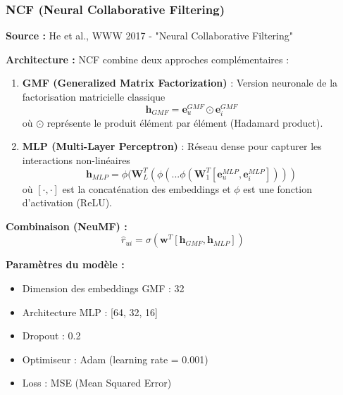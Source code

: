 \documentclass[12pt,a4paper]{article}
\begin{document}
\subsubsection{NCF (Neural Collaborative Filtering)}

\textbf{Source :} He et al., WWW 2017 - "Neural Collaborative Filtering"

\textbf{Architecture :} NCF combine deux approches complémentaires :

\begin{enumerate}
    \item \textbf{GMF (Generalized Matrix Factorization)} : Version neuronale de la factorisation matricielle classique
    \begin{equation}
        \mathbf{h}_{GMF} = \mathbf{e}_u^{GMF} \odot \mathbf{e}_i^{GMF}
    \end{equation}
    où $\odot$ représente le produit élément par élément (Hadamard product).
    
    \item \textbf{MLP (Multi-Layer Perceptron)} : Réseau dense pour capturer les interactions non-linéaires
    \begin{equation}
        \mathbf{h}_{MLP} = \phi(\mathbf{W}_L^T(\phi(...\phi(\mathbf{W}_1^T[\mathbf{e}_u^{MLP}, \mathbf{e}_i^{MLP}])))
    \end{equation}
    où $[\cdot, \cdot]$ est la concaténation des embeddings et $\phi$ est une fonction d'activation (ReLU).
\end{enumerate}

\textbf{Combinaison (NeuMF) :}
\begin{equation}
    \hat{r}_{ui} = \sigma(\mathbf{w}^T [\mathbf{h}_{GMF}, \mathbf{h}_{MLP}])
\end{equation}

\textbf{Paramètres du modèle :}
\begin{itemize}
    \item Dimension des embeddings GMF : 32
    \item Architecture MLP : [64, 32, 16]
    \item Dropout : 0.2
    \item Optimiseur : Adam (learning rate = 0.001)
    \item Loss : MSE (Mean Squared Error)
\end{itemize}
\end{document}
